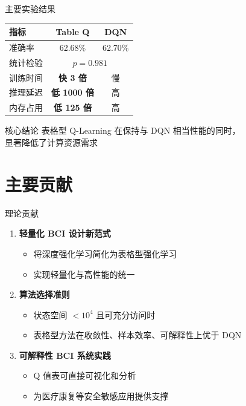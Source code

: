 \begin{frame}{主要实验结果}
    \begin{table}[h]
        \centering
        \begin{tabular}{lcc}
            \hline
            \textbf{指标} & \textbf{Table Q} & \textbf{DQN} \\
            \hline
            准确率 & 62.68\% & 62.70\% \\
            统计检验 & \multicolumn{2}{c}{$p = 0.981$} \\
            训练时间 & \textbf{快 3 倍} & 慢 \\
            推理延迟 & \textbf{低 1000 倍} & 高 \\
            内存占用 & \textbf{低 125 倍} & 高 \\
            \hline
        \end{tabular}
    \end{table}
    
    \vspace{0.3cm}
    \begin{alertblock}{核心结论}
        表格型 Q-Learning 在保持与 DQN 相当性能的同时，\\
        显著降低了计算资源需求
    \end{alertblock}
\end{frame}

\section{主要贡献}

\begin{frame}{理论贡献}
    \begin{enumerate}
        \item \textbf{轻量化 BCI 设计新范式}
        \begin{itemize}
            \item 将深度强化学习简化为表格型强化学习
            \item 实现轻量化与高性能的统一
        \end{itemize}
        
        \item \textbf{算法选择准则}
        \begin{itemize}
            \item 状态空间 $< 10^4$ 且可充分访问时
            \item 表格型方法在收敛性、样本效率、可解释性上优于 DQN
        \end{itemize}
        
        \item \textbf{可解释性 BCI 系统实践}
        \begin{itemize}
            \item Q 值表可直接可视化和分析
            \item 为医疗康复等安全敏感应用提供支撑
        \end{itemize}
    \end{enumerate}
\end{frame}

